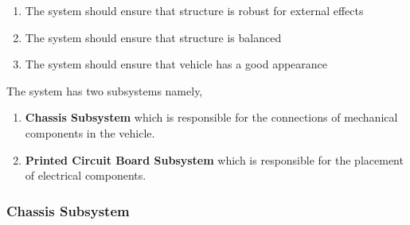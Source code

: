\documentclass[a4paper,12pt]{article}
\begin{document}
\begin{enumerate}

\item The system should	ensure that structure is robust for external effects 

\item The system should	ensure that structure is balanced

\item The system should ensure that vehicle has a good appearance

\end{enumerate}	



The system has two subsystems namely,


\begin{enumerate}

\item \textbf{Chassis Subsystem} which is responsible for the connections of mechanical components in the vehicle.

\item \textbf{Printed Circuit Board Subsystem} which is responsible for the placement of electrical components.

\end{enumerate}



\subsubsection{Chassis Subsystem}
\end{document}
